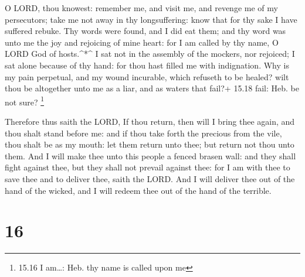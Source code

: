  O LORD, thou knowest: remember me, and visit me, and
revenge me of my persecutors; take me not away in thy longsuffering:
know that for thy sake I have suffered rebuke.  Thy words
were found, and I did eat them; and thy word was unto me the joy and
rejoicing of mine heart: for I am called by thy name, O LORD God of
hosts.\^{}*\^{}  I sat not in the assembly of the mockers,
nor rejoiced; I sat alone because of thy hand: for thou hast filled me
with indignation.  Why is my pain perpetual, and my wound
incurable, which refuseth to be healed? wilt thou be altogether unto me
as a liar, and as waters that fail?+ 15.18 fail: Heb. be not sure?
\footnote{15.16 I am\ldots: Heb. thy name is called upon me}

 Therefore thus saith the LORD, If thou return, then will I
bring thee again, and thou shalt stand before me: and if thou take forth
the precious from the vile, thou shalt be as my mouth: let them return
unto thee; but return not thou unto them.  And I will make
thee unto this people a fenced brasen wall: and they shall fight against
thee, but they shall not prevail against thee: for I am with thee to
save thee and to deliver thee, saith the LORD.  And I will
deliver thee out of the hand of the wicked, and I will redeem thee out
of the hand of the terrible.

\hypertarget{section-15}{%
\section{16}\label{section-15}}

